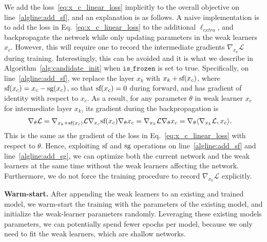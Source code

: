 We add the loss~\ref{eq:x_c_linear_loss} implicitly to the overall objective on line~\ref{algline:add_sf}, and an explanation is as follows.
A naive implementation is to add the loss in Eq.~\ref{eq:x_c_linear_loss} to the additional $\ell_{extra}$, and backpropagate the network
while only updating parameters in the weak learners $x_c$. 
However, this will require one to record the intermediate gradients $\nabla _{x_{k}} \mathcal{L}$ during training. 
Interestingly, this can be avoided and it is what we describe in Algorithm~\ref{alg:candidate_init} when $\texttt{is\_frozen}$ is set to true. 
Specifically, on line~\ref{algline:add_sf}, we replace the layer $x_k$ with $x_k + \textrm{sf}(x_c)$, 
where $\textrm{sf}(x_c) = x_c - \textrm{sg}(x_c)$, so that $\textrm{sf}(x_c) = 0$  during 
forward, and has gradient of identity with respect to $x_c$. As a result, 
for any parameter $\theta$ in weak learner $x_c$ for intermediate layer $x_k$, its gradient during the backpropagation is
\begin{align}
\nabla_{\theta} \mathcal{L} &= \nabla _{x_k + \textrm{sf}(x_c)} \mathcal{L} \nabla _{x_c} \textrm{sf}(x_c) \nabla _{\theta} x_c = \nabla _{x_k}\mathcal{L} \nabla _{\theta} x_c = \nabla_{\theta} \langle \nabla_{x_{k}} \mathcal{L}, x_c \rangle.
\end{align}
This is the same as the gradient of the loss in Eq.~\ref{eq:x_c_linear_loss} with respect to $\theta$.
Hence, exploiting $\textrm{sf}$ and $\textrm{sg}$ operations on line~\ref{algline:add_sf} and line~\ref{algline:add_sg}, we can
optimize both the current network and the weak learners at the same time without the weak learners affecting the network. Furthermore, 
we do not force the training procedure to record $\nabla_{x_k} \mathcal{L}$ explicitly. 

\textbf{Warm-start.} After appending the weak learners to an existing and trained model, we warm-start the training with the parameters
of the existing model, and initialize the weak-learner parameters randomly. Leveraging these existing models parameters, 
we can potentially spend fewer epochs per model, because we only need to fit the weak learners, which are
shallow networks.

